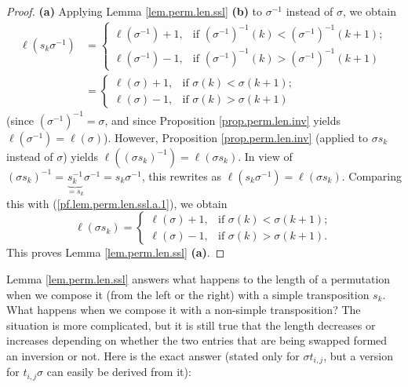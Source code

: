 \begin{proof}
\textbf{(a)} Applying Lemma \ref{lem.perm.len.ssl} \textbf{(b)} to
$\sigma^{-1}$ instead of $\sigma$, we obtain%
\begin{align}
\ell\left(  s_{k}\sigma^{-1}\right)   &  =%
\begin{cases}
\ell\left(  \sigma^{-1}\right)  +1, & \text{if }\left(  \sigma^{-1}\right)
^{-1}\left(  k\right)  <\left(  \sigma^{-1}\right)  ^{-1}\left(  k+1\right)
;\\
\ell\left(  \sigma^{-1}\right)  -1, & \text{if }\left(  \sigma^{-1}\right)
^{-1}\left(  k\right)  >\left(  \sigma^{-1}\right)  ^{-1}\left(  k+1\right)
\end{cases}
\nonumber\\
&  =%
\begin{cases}
\ell\left(  \sigma\right)  +1, & \text{if }\sigma\left(  k\right)
<\sigma\left(  k+1\right)  ;\\
\ell\left(  \sigma\right)  -1, & \text{if }\sigma\left(  k\right)
>\sigma\left(  k+1\right)
\end{cases}
\label{pf.lem.perm.len.ssl.a.1}%
\end{align}
(since $\left(  \sigma^{-1}\right)  ^{-1}=\sigma$, and since Proposition
\ref{prop.perm.len.inv} yields $\ell\left(  \sigma^{-1}\right)  =\ell\left(
\sigma\right)  $). However, Proposition \ref{prop.perm.len.inv} (applied to
$\sigma s_{k}$ instead of $\sigma$) yields $\ell\left(  \left(  \sigma
s_{k}\right)  ^{-1}\right)  =\ell\left(  \sigma s_{k}\right)  $. In view of
$\left(  \sigma s_{k}\right)  ^{-1}=\underbrace{s_{k}^{-1}}_{=s_{k}}%
\sigma^{-1}=s_{k}\sigma^{-1}$, this rewrites as $\ell\left(  s_{k}\sigma
^{-1}\right)  =\ell\left(  \sigma s_{k}\right)  $. Comparing this with
(\ref{pf.lem.perm.len.ssl.a.1}), we obtain%
\[
\ell\left(  \sigma s_{k}\right)  =%
\begin{cases}
\ell\left(  \sigma\right)  +1, & \text{if }\sigma\left(  k\right)
<\sigma\left(  k+1\right)  ;\\
\ell\left(  \sigma\right)  -1, & \text{if }\sigma\left(  k\right)
>\sigma\left(  k+1\right)  .
\end{cases}
\]
This proves Lemma \ref{lem.perm.len.ssl} \textbf{(a)}.
\end{proof}

Lemma \ref{lem.perm.len.ssl} answers what happens to the length of a
permutation when we compose it (from the left or the right) with a simple
transposition $s_{k}$. What happens when we compose it with a non-simple
transposition? The situation is more complicated, but it is still true that
the length decreases or increases depending on whether the two entries that
are being swapped formed an inversion or not. Here is the exact answer (stated
only for $\sigma t_{i,j}$, but a version for $t_{i,j}\sigma$ can easily be
derived from it):

